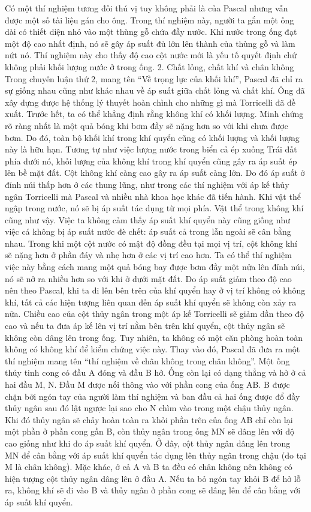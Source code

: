 \begin{multicols}{2}
	Có một thí nghiệm tương đối thú vị tuy không phải là của Pascal nhưng vẫn được một số tài liệu gán cho ông. Trong thí nghiệm này, người ta gắn một ống dài có thiết diện nhỏ vào một thùng gỗ chứa đầy nước. Khi nước trong ống đạt một độ cao nhất định, nó sẽ gây áp suất đủ lớn lên thành của thùng gỗ và làm nứt nó. Thí nghiệm này cho thấy độ cao cột nước mới là yếu tố quyết định chứ không phải khối lượng nước ở trong ống. 
	2. Chất lỏng, chất khí và chân không
	Trong chuyên luận thứ 2, mang tên “Về trọng lực của khối khí”, Pascal đã chỉ ra sự giống nhau cũng như khác nhau về áp suất giữa chất lỏng và chất khí. Ông đã xây dựng được hệ thống lý thuyết hoàn chình cho những gì mà Torricelli đã đề xuất. Trước hết, ta có thể khẳng định rằng không khí có khối lượng. Minh chứng rõ ràng nhất là một quả bóng khi bơm đầy sẽ nặng hơn so với khi chưa được bơm. Do đó, toàn bộ khối khí trong khí quyển cũng có khối lượng và khối lượng này là hữu hạn. Tương tự như việc lượng nước trong biển cả ép xuống Trái đất phía dưới nó, khối lượng của không khí trong khí quyển cũng gây ra áp suất ép lên bề mặt đất. Cột không khí càng cao gây ra áp suất càng lớn. Do đó áp suất ở đỉnh núi thấp hơn ở các thung lũng, như trong các thí nghiệm với áp kế thủy ngân Torricelli mà Pascal và nhiều nhà khoa học khác đã tiến hành.
	Khi vật thể ngập trong nước, nó sẽ bị áp suất tác dụng từ mọi phía. Vật thể trong không khí cũng như vậy. Việc ta không cảm thấy áp suất khí quyển này cũng giống như việc cá không bị áp suất nước đè chết: áp suất cả trong lẫn ngoài sẽ cân bằng nhau.
	Trong khi một cột nước có mật độ đồng đều tại mọi vị trí, cột không khí sẽ nặng hơn ở phần đáy và nhẹ hơn ở các vị trí cao hơn. Ta có thể thí nghiệm việc này bằng cách mang một quả bóng bay được bơm đầy một nửa lên đỉnh núi, nó sẽ nở ra nhiều hơn so với khi ở dưới mặt đất. Do áp suất giảm theo độ cao nên theo Pascal, khi ta đi lên bên trên của khí quyển hay ở vị trí không có không khí, tất cả các hiện tượng liên quan đến áp suất khí quyển sẽ không còn xảy ra nữa. Chiều cao của cột thủy ngân trong một áp kế Torricelli sẽ giảm dần theo độ cao và nếu ta đưa áp kế lên vị trí nằm bên trên khí quyển, cột thủy ngân sẽ không còn dâng lên trong ống. Tuy nhiên, ta không có một căn phòng hoàn toàn không có không khí để kiểm chứng việc này. Thay vào đó, Pascal đã đưa ra một thí nghiệm mang tên “thí nghiệm về chân không trong chân không”.
	Một ống thủy tinh cong có đầu A đóng và đầu B hở. Ống còn lại có dạng thẳng và hở ở cả hai đầu M, N. Đầu M được nối thông vào với phần cong của ống AB. B được chặn bởi ngón tay của người làm thí nghiệm và ban đầu cả hai ống được đổ đầy thủy ngân sau đó lật ngược lại sao cho N chìm vào trong một chậu thủy ngân. Khi đó thủy ngân sẽ chảy hoàn toàn ra khỏi phần trên của ống AB chỉ còn lại một phần ở phần cong gần B, còn thủy ngân trong ống MN sẽ dâng lên với độ cao giống như khi đo áp suất khí quyển. Ở đây, cột thủy ngân dâng lên trong MN để cân bằng với áp suất khí quyển tác dụng lên thủy ngân trong chậu (do tại M là chân không). Mặc khác, ở cả A và B ta đều có chân không nên không có hiện tượng cột thủy ngân dâng lên ở đầu A. Nếu ta bỏ ngón tay khỏi B để hở lỗ ra, không khí sẽ đi vào B và thủy ngân ở phần cong sẽ dâng lên để cân bằng với áp suất khí quyển.
	

\end{multicols}
